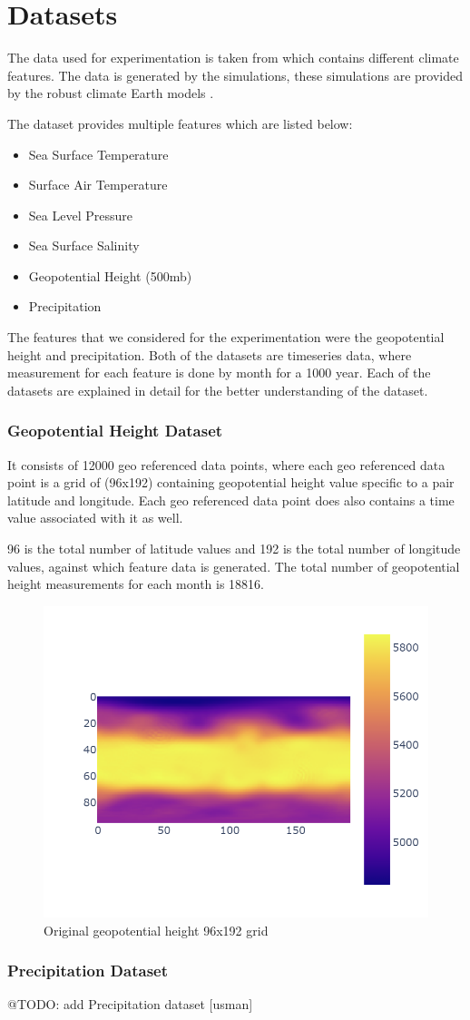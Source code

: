 
\clearpage
\cleardoublepage

\chapter{Datasets}
\label{chap:dataset}

The data used for experimentation is taken from \cite{willi_rath_2023_7779883} which contains different climate features. The data is generated by the simulations, these simulations are provided by the robust climate Earth models \cite{willi_rath_2023_7779883}.

The dataset provides multiple features which are listed below:
\begin{itemize}
    \item Sea Surface Temperature
    \item Surface Air Temperature
    \item Sea Level Pressure
    \item Sea Surface Salinity
    \item Geopotential Height (500mb)
    \item Precipitation
\end{itemize}

The features that we considered for the experimentation were the geopotential height and precipitation.
Both of the datasets are timeseries data, where measurement for each feature is done by month for a 1000 year. Each of the datasets are explained in detail for the better understanding of the dataset.
\subsection{Geopotential Height Dataset}
It consists of 12000 geo referenced data points, where each geo referenced data point is a grid of (96x192) containing geopotential height value specific to a pair latitude and longitude.
Each geo referenced data point does also contains a time value associated with it as well.

96  is the total number of latitude values and  192 is the total number of longitude values, against which feature data is generated. The total number of geopotential height measurements for each month is 18816.

\begin{figure}[H]
    \centering
    \includegraphics[width=0.6\linewidth]{figures/chapter-5/data_original.png}
    \caption{Original geopotential height 96x192 grid }
    \label{fig:org_geopoth}
\end{figure}

\subsection{Precipitation Dataset}

@TODO: add Precipitation dataset [usman]